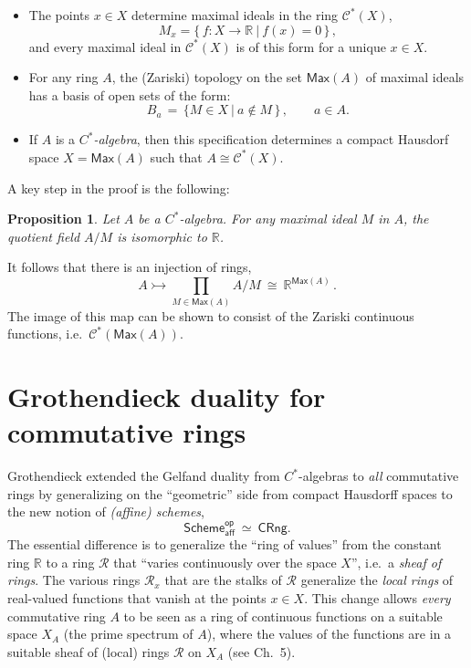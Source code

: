 \documentclass[12pt]{article}
\newcommand{\mono}{\ensuremath{\rightarrowtail}}
\newtheorem*{theorem*}{Theorem}
\newtheorem*{proposition*}{Proposition}
\theoremstyle{remark}
\theoremstyle{definition}
\begin{document}
\begin{itemize}
\item The points  $x\in X$ determine maximal ideals in the ring $\mathcal{C}^*(X)$,
\[
M_x = \{\, f : X\to \mathbb{R}\ |\ f(x) = 0\, \}\,,
\]
and every maximal ideal in $\mathcal{C}^*(X)$ is of this form for a unique $x\in X$.

\item For any ring $A$, the (Zariski) topology on the set $\mathsf{Max}(A)$ of maximal ideals has a basis of open sets of the form:
\[
B_a\, =\, \{M \in X\ |\ a\notin M\, \}\, ,\qquad a\in A.
\]

\item If $A$ is a \emph{$C^*$-algebra}, then this specification  determines a compact Hausdorf space $X = \mathsf{Max}(A)$ such that $A\cong \mathcal{C}^*(X)$.
\end{itemize}

A key step in the proof is the following:
%
 \begin{proposition*}
 Let $A$ be a $C^*$-algebra.  For any maximal ideal $M$ in $A$, the quotient field 
 $A/M$ is isomorphic to  $\mathbb{R}$. 
    \end{proposition*}
%   
It follows that there is an injection of rings,
$$A \mono \prod_{M\in \mathsf{Max}(A)}\!\!A/M\ \cong\ \mathbb{R}^{\mathsf{Max}(A)}\,.$$
The image of this map can be shown to consist of the Zariski continuous functions, i.e.\  $\mathcal{C}^*(\mathsf{Max}(A))$.



\section{Grothendieck duality for commutative rings}

Grothendieck extended the Gelfand duality from $C^*$-algebras to \emph{all} commutative rings by generalizing on the ``geometric'' side from compact Hausdorff spaces to the new notion of \emph{(affine) schemes},
 \[
\mathsf{Scheme}_\mathsf{aff}^\mathsf{op}\ \simeq\ \mathsf{CRng}.
 \]
The essential difference is to generalize the ``ring of values'' from the constant ring $\mathbb{R}$ to a ring $\mathcal{R}$ that ``varies continuously over the space $X$'', i.e.\ a \emph{sheaf of rings}.   
The various rings $\mathcal{R}_x$ that are the stalks of $\mathcal{R}$ generalize the \emph{local rings} of real-valued functions that vanish at the points $x\in X$.
This change allows \emph{every} commutative ring $A$ to be seen as a ring of continuous functions on a suitable space $X_A$ (the prime spectrum of $A$), where the values of the functions are in a suitable sheaf of (local) rings $\mathcal{R}$ on $X_A$ (see \cite{J} Ch.~5).
\end{document}
